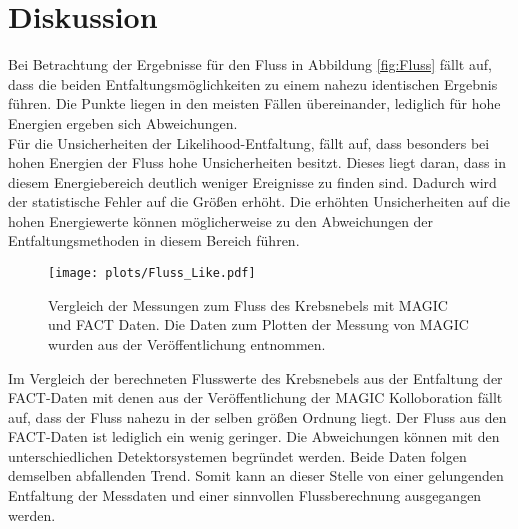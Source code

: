 \section{Diskussion}
Bei Betrachtung der Ergebnisse für den Fluss in Abbildung \ref{fig:Fluss} fällt auf, dass die beiden Entfaltungsmöglichkeiten zu einem nahezu identischen Ergebnis führen. Die Punkte liegen in den meisten Fällen übereinander, lediglich für hohe Energien ergeben sich Abweichungen.\\
Für die Unsicherheiten der Likelihood-Entfaltung, fällt auf, dass besonders bei hohen Energien der Fluss hohe Unsicherheiten besitzt. Dieses liegt daran, dass in diesem Energiebereich deutlich weniger Ereignisse zu finden sind. Dadurch wird der statistische Fehler auf die Größen erhöht. Die erhöhten Unsicherheiten auf die hohen Energiewerte können möglicherweise zu den Abweichungen der Entfaltungsmethoden in diesem Bereich führen.
\begin{figure}
	\texttt{[image: plots/Fluss\_Like.pdf]}
	\caption{Vergleich der Messungen zum Fluss des Krebsnebels mit MAGIC und FACT Daten. Die Daten zum Plotten der Messung von MAGIC wurden aus der Veröffentlichung \cite{Aleksic:2014jva} entnommen.}
	\label{fig:VGL}
\end{figure}
\FloatBarrier
Im Vergleich der berechneten Flusswerte des Krebsnebels aus der Entfaltung der FACT-Daten mit denen aus der Veröffentlichung \cite{Aleksic:2014jva} der MAGIC Kolloboration fällt auf, dass der Fluss nahezu in der selben größen Ordnung liegt. Der Fluss aus den FACT-Daten ist lediglich ein wenig geringer. Die Abweichungen können mit den unterschiedlichen Detektorsystemen begründet werden. Beide Daten folgen demselben abfallenden Trend. Somit kann an dieser Stelle von einer gelungenden Entfaltung der Messdaten und einer sinnvollen Flussberechnung ausgegangen werden.
